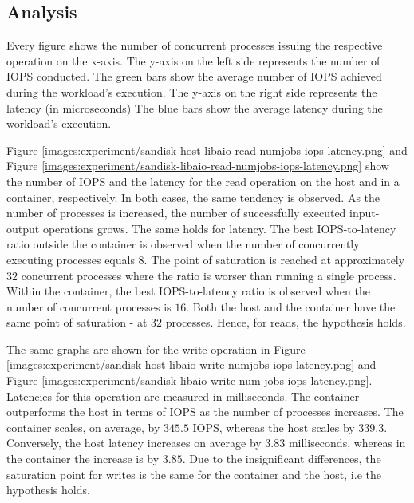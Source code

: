 \subsection{Analysis}
Every figure shows the number of concurrent processes issuing the respective operation on the 
x-axis. The y-axis on the left side represents the number of IOPS conducted. The green bars 
show the average number of IOPS achieved during the workload's execution. The y-axis on the right side 
represents the latency (in microseconds) The blue bars show the average latency during the workload's execution. 

Figure \ref{images:experiment/sandisk-host-libaio-read-numjobs-iops-latency.png} and 
Figure \ref{images:experiment/sandisk-libaio-read-numjobs-iops-latency.png} show the 
number of IOPS and the latency for the read operation on the host and in a container, respectively. 
In both cases, the same tendency is observed. As the number of processes is increased, 
the number of successfully executed input-output operations grows. The same holds for latency. 
The best IOPS-to-latency ratio outside the container is observed when the number of concurrently 
executing processes equals $8$. The point of saturation is reached at approximately $32$ 
concurrent processes where the ratio is worser than running a single process. Within the container,
the best IOPS-to-latency ratio is observed when the number of concurrent processes is $16$. 
Both the host and the container have the same point of saturation - at $32$ processes.
Hence, for reads, the hypothesis holds. 

The same graphs are shown for the write operation in Figure \ref{images:experiment/sandisk-host-libaio-write-numjobs-iops-latency.png} and 
Figure \ref{images:experiment/sandisk-libaio-write-num-jobs-iops-latency.png}. Latencies for 
this operation are measured in milliseconds. The container outperforms the host 
in terms of IOPS as the number of processes increases. The container scales, on average, 
by $345.5$ IOPS, whereas the host scales by $339.3$. Conversely, the host 
latency increases on average by $3.83$ milliseconds, whereas in the container the increase 
is by $3.85$. Due to the insignificant differences, the saturation point for writes 
is the same for the container and the host, i.e the hypothesis holds. 



